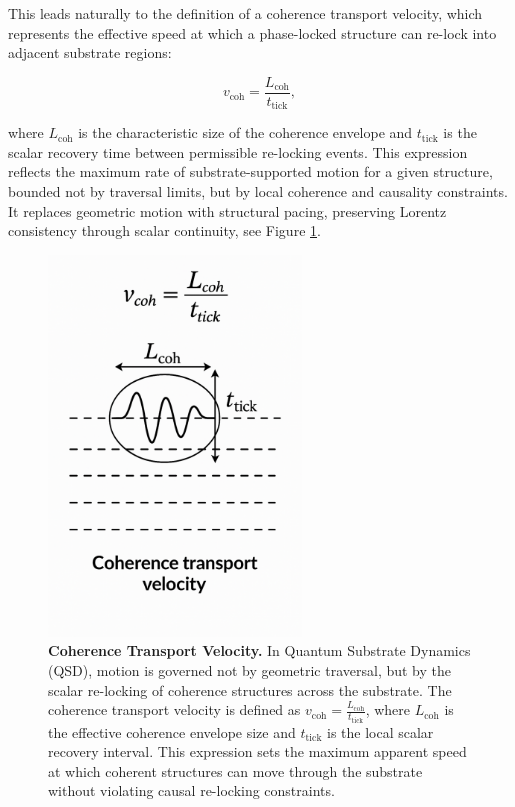 \documentclass[entropy,article,submit,pdftex,moreauthors]{Definitions/mdpi}
\begin{document}
This leads naturally to the definition of a coherence transport velocity, which represents the effective speed at which a phase-locked structure can re-lock into adjacent substrate regions:

\begin{equation}
    v_{\text{coh}} = \frac{L_{\text{coh}}}{t_{\text{tick}}},
\end{equation}

where \( L_{\text{coh}} \) is the characteristic size of the coherence envelope and \( t_{\text{tick}} \) is the scalar recovery time between permissible re-locking events. This expression reflects the maximum rate of substrate-supported motion for a given structure, bounded not by traversal limits, but by local coherence and causality constraints. It replaces geometric motion with structural pacing, preserving Lorentz consistency through scalar continuity, see Figure \ref{fig:coherence-transport-velocity}.

\begin{figure}[H]
    \centering
    \includegraphics[width=0.6\textwidth]{figures/CTV.pdf}
    \caption{
    \textbf{Coherence Transport Velocity.} 
    In Quantum Substrate Dynamics (QSD), motion is governed not by geometric traversal, but by the scalar re-locking of coherence structures across the substrate. The coherence transport velocity is defined as \( v_{\text{coh}} = \frac{L_{\text{coh}}}{t_{\text{tick}}} \), where \( L_{\text{coh}} \) is the effective coherence envelope size and \( t_{\text{tick}} \) is the local scalar recovery interval. This expression sets the maximum apparent speed at which coherent structures can move through the substrate without violating causal re-locking constraints.
    }
    \label{fig:coherence-transport-velocity}
\end{figure}
\end{document}
